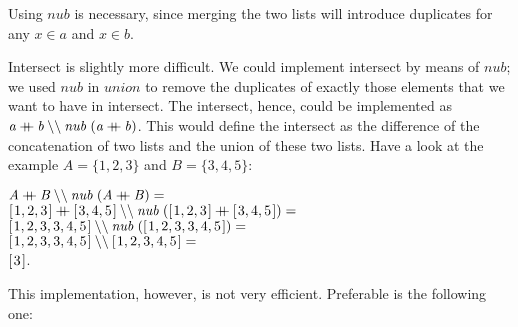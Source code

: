 \documentclass{scrreprt}
\newcommand{\Conid}[1]{\mathit{#1}}
\newcommand{\Varid}[1]{\mathit{#1}}
\newcommand{\plus}{\mathbin{+\!\!\!+}}
\begin{document}
Using $nub$ is necessary,
since merging the two lists
will introduce duplicates for any 
$x \in a$ and $x \in b$.

Intersect is slightly more difficult.
We could implement intersect by means
of $nub$; we used $nub$ in $union$
to remove the duplicates of exactly those elements
that we want to have in intersect.
The intersect, hence, could be implemented as
\ensuremath{\Varid{a}\plus \Varid{b}\mathbin{\char92 \char92 }\Varid{nub}\;(\Varid{a}\plus \Varid{b})}.
This would define the intersect as the difference
of the concatenation of two lists
and the union of these two lists.
Have a look at the example
$A=\lbrace 1,2,3\rbrace$ and
$B=\lbrace 3,4,5\rbrace$:

\ensuremath{\Conid{A}\plus \Conid{B}\mathbin{\char92 \char92 }\Varid{nub}\;(\Conid{A}\plus \Conid{B})\mathrel{=}}\\
\ensuremath{[\mskip1.5mu \mathrm{1},\mathrm{2},\mathrm{3}\mskip1.5mu]\plus [\mskip1.5mu \mathrm{3},\mathrm{4},\mathrm{5}\mskip1.5mu]\mathbin{\char92 \char92 }\Varid{nub}\;([\mskip1.5mu \mathrm{1},\mathrm{2},\mathrm{3}\mskip1.5mu]\plus [\mskip1.5mu \mathrm{3},\mathrm{4},\mathrm{5}\mskip1.5mu])\mathrel{=}}\\
\ensuremath{[\mskip1.5mu \mathrm{1},\mathrm{2},\mathrm{3},\mathrm{3},\mathrm{4},\mathrm{5}\mskip1.5mu]\mathbin{\char92 \char92 }\Varid{nub}\;([\mskip1.5mu \mathrm{1},\mathrm{2},\mathrm{3},\mathrm{3},\mathrm{4},\mathrm{5}\mskip1.5mu])\mathrel{=}}\\
\ensuremath{[\mskip1.5mu \mathrm{1},\mathrm{2},\mathrm{3},\mathrm{3},\mathrm{4},\mathrm{5}\mskip1.5mu]\mathbin{\char92 \char92 }[\mskip1.5mu \mathrm{1},\mathrm{2},\mathrm{3},\mathrm{4},\mathrm{5}\mskip1.5mu]\mathrel{=}}\\
\ensuremath{[\mskip1.5mu \mathrm{3}\mskip1.5mu]}.
         
This implementation, however,
is not very efficient.
Preferable is the following one:
\end{document}
